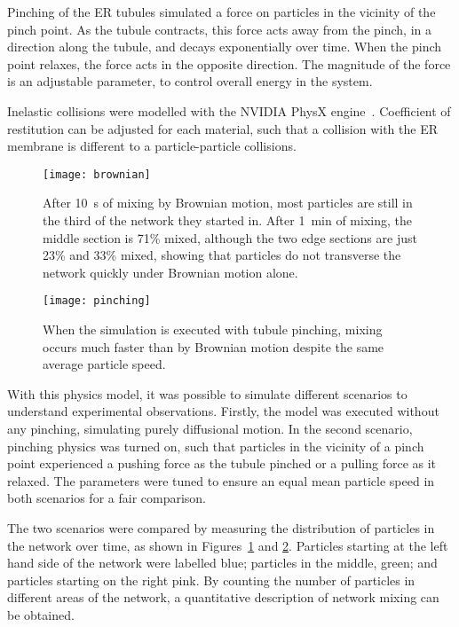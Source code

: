 Pinching of the ER tubules simulated a force on particles in the vicinity of the pinch point. 
As the tubule contracts, this force acts away from the pinch, in a direction along the tubule, and decays exponentially over time. 
When the pinch point relaxes, the force acts in the opposite direction. 
The magnitude of the force is an adjustable parameter, to control overall energy in the system. 

Inelastic collisions were modelled with the NVIDIA PhysX engine~\cite{nvidia2008physx}. 
Coefficient of restitution can be adjusted for each material, such that a collision with the ER membrane is different to a particle-particle collisions. 

\begin{figure}[t!]
	\centering
	\texttt{[image: brownian]}
	\caption[ER simulation: After one minute of mixing by Brownian motion the simulated ER mixture is not homogeneous]{After \SI{10}{\second} of mixing by Brownian motion, most particles are still in the third of the network they started in. After \SI{1}{\minute} of mixing, the middle section is 71\% mixed, although the two edge sections are just 23\% and 33\% mixed, showing that particles do not transverse the network quickly under Brownian motion alone. }
	\label{fig:ER-simulation-brownian}
\end{figure}

\begin{figure}[t!]
	\centering
	\texttt{[image: pinching]}
	\caption[ER simulation: A homogeneous mixture is achieved after one minute in the ER simulation with pinching]{When the simulation is executed with tubule pinching, mixing occurs much faster than by Brownian motion despite the same average particle speed.}
	\label{fig:ER-simulation-pinching}
\end{figure}

With this physics model, it was possible to simulate different scenarios to understand experimental observations. 
Firstly, the model was executed without any pinching, simulating purely diffusional motion. 
In the second scenario, pinching physics was turned on, such that particles in the vicinity of a pinch point experienced a pushing force as the tubule pinched or a pulling force as it relaxed. 
The parameters were tuned to ensure an equal mean particle speed in both scenarios for a fair comparison. 

The two scenarios were compared by measuring the distribution of particles in the network over time, as shown in Figures~\ref{fig:ER-simulation-brownian} and \ref{fig:ER-simulation-pinching}. 
Particles starting at the left hand side of the network were labelled blue; particles in the middle, green; and particles starting on the right pink. 
By counting the number of particles in different areas of the network, a quantitative description of network mixing can be obtained. 

